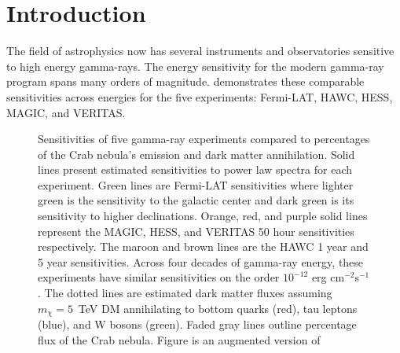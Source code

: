 \section{Introduction} \label{sec:gd_intro}

The field of astrophysics now has several instruments and observatories sensitive to high energy gamma-rays.
The energy sensitivity for the modern gamma-ray program spans many orders of magnitude.
 demonstrates these comparable sensitivities across energies for the five experiments: Fermi-LAT, HAWC, HESS, MAGIC, and VERITAS.

\begin{figure}[t]
    \caption{Sensitivities of five gamma-ray experiments compared to percentages of the Crab nebula's emission and dark matter annihilation. Solid lines present estimated sensitivities to power law spectra \fu for each experiment. Green lines are Fermi-LAT sensitivities where lighter green is the sensitivity to the galactic center and dark green is its sensitivity to higher declinations. Orange, red, and purple solid lines represent the MAGIC, HESS, and VERITAS 50 hour sensitivities respectively. The maroon and brown lines are the HAWC 1 year and 5 year sensitivities. Across four decades of gamma-ray energy, these experiments have similar sensitivities on the order $10^{-12}$ erg cm$^{-2}$s$^{-1}$. The dotted lines are estimated dark matter fluxes assuming $m_{\chi} = 5$~TeV DM annihilating to bottom quarks (red), tau leptons (blue), and W bosons (green). Faded gray lines outline percentage flux of the Crab nebula. Figure is an augmented version of \cite{2020Galax...8...25R}}
    \label{fig:gd_motivation}
\end{figure}

